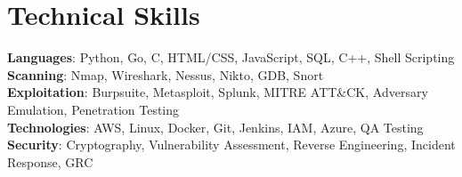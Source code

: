 \documentclass[letterpaper,11pt]{article}
\begin{document}
%
\section{Technical Skills}
 \begin{itemize}[leftmargin=0.15in, label={}]
    \small{\item{
     \textbf{Languages}{: Python, Go, C, HTML/CSS, JavaScript, SQL, C++, Shell Scripting} \\
     \textbf{Scanning}{: Nmap, Wireshark, Nessus, Nikto, GDB, Snort} \\
     \textbf{Exploitation}{: Burpsuite, Metasploit, Splunk, MITRE ATT\&CK, Adversary Emulation, Penetration Testing} \\
     \textbf{Technologies}{: AWS, Linux, Docker, Git, Jenkins, IAM, Azure, QA Testing} \\
     \textbf{Security}{: Cryptography, Vulnerability Assessment, Reverse Engineering, Incident Response, GRC} \\
    }}
 \end{itemize}
 \vspace{-16pt}
\end{document}
